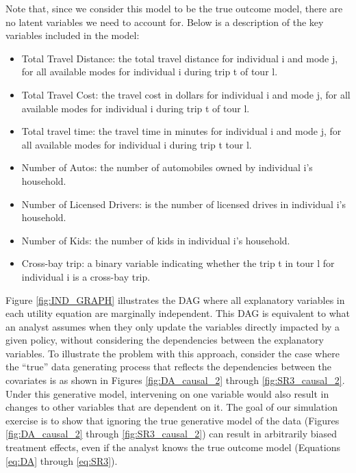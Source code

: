 Note that, since we consider this model to be the true outcome model, there are no latent variables we need to account for.
Below is a description of the key variables included in the model:

\begin{itemize}
  \item Total Travel Distance: the total travel distance for individual i and mode j, for all available modes for individual i during trip t of tour l.
  \item Total Travel Cost: the travel cost in dollars for individual i and mode j, for all available modes for individual i during trip t of tour l.
  \item Total travel time: the travel time in minutes for individual i and mode j, for all available modes for individual i during trip t tour l.
  \item Number of Autos: the number of automobiles owned by individual i's household.
  \item Number of Licensed Drivers: is the number of licensed drives in individual i's household.
  \item Number of Kids: the number of kids in individual i's household.
  \item Cross-bay trip: a binary variable indicating whether the trip t in tour l for individual i is a cross-bay trip.
\end{itemize}

Figure \ref{fig:IND_GRAPH} illustrates the DAG where all explanatory variables in each utility equation are marginally independent.
This DAG is equivalent to what an analyst assumes when they only update the variables directly impacted by a given policy, without considering the dependencies between the explanatory variables.
To illustrate the problem with this approach, consider the case where the ``true'' data generating process that reflects the dependencies between the covariates is as shown in Figures \ref{fig:DA_causal_2} through \ref{fig:SR3_causal_2}.
Under this generative model, intervening on one variable would also result in changes to other variables that are dependent on it.
The goal of our simulation exercise is to show that ignoring the true generative model of the data (Figures \ref{fig:DA_causal_2} through \ref{fig:SR3_causal_2}) can result in arbitrarily biased treatment effects, even if the analyst knows the true outcome model (Equations \ref{eq:DA} through \ref{eq:SR3}).

